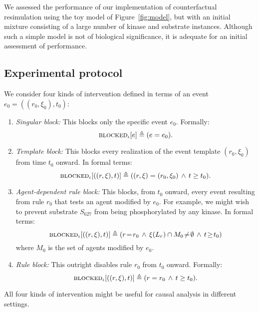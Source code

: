 
\newcommand{\subs}[2]{#1_{\textsf{#2}}}

We assessed the performance of our implementation of counterfactual
resimulation using the toy model of Figure~\ref{fig:model}, but with an initial
mixture consisting of a large number of kinase and substrate instances. Although
such a simple model is not of biological significance, it is adequate for an
initial assessment of performance.

\subsection{Experimental protocol}

We consider four kinds of intervention defined in terms of an event
$e_0=((r_0, \xi_0), t_0)$:
\begin{enumerate}[leftmargin=0.4cm]
\item \textit{Singular block:} This blocks only the specific event $e_0$.
Formally:
\[{\textsc{blocked}}_{\iota}[e] \triangleq (e = e_0).\]
\item \textit{Template block:} This blocks every realization of the event template $(r_0, \xi_0)$ from time $t_0$ onward. In formal terms:
\[{\textsc{blocked}}_{\iota}[((r, \xi), t)] \triangleq ((r, \xi) = (r_0, \xi_0)
\,\wedge\, t \geq t_0).\]
\item \textit{Agent-dependent rule block:} This blocks, from
$t_0$ onward, every event resulting from rule $r_0$ that tests an agent
modified by $e_0$. For example, we might wish to prevent substrate $S_{627}$ from being phosphorylated by any kinase. In formal terms: \[{\textsc{blocked}}_{\iota}[((r, \xi), t)] \triangleq (r \!=\! r_0 \,\wedge\, \xi(L_r)\cap M_0 \!\neq\! \emptyset \,\wedge\, t \!\geq\! t_0)\] where $M_0$ is the set of agents modified by $e_0$.
\item \textit{Rule block:} This outright disables rule
$r_0$ from $t_0$ onward.
Formally:
\[{\textsc{blocked}}_{\iota}[((r, \xi), t)] \triangleq (r = r_0 \,\wedge\, t \geq t_0).\]
\end{enumerate}
All four kinds of intervention might be useful for causal analysis in
different settings.

